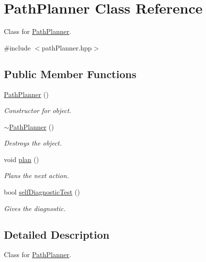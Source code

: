 \hypertarget{class_path_planner}{}\section{Path\+Planner Class Reference}
\label{class_path_planner}


Class for \hyperlink{class_path_planner}{Path\+Planner}.  




{\ttfamily \#include $<$path\+Planner.\+hpp$>$}

\subsection*{Public Member Functions}
\begin{DoxyCompactItemize}
\item 
\hyperlink{class_path_planner_a376f30d795cfe0a40f8923f49336f7da}{Path\+Planner} ()
\begin{DoxyCompactList}\small\item\em Constructor for object. \end{DoxyCompactList}\item 
\hyperlink{class_path_planner_a61bd61f848e519df56b75eddd3732ab8}{$\sim$\+Path\+Planner} ()\hypertarget{class_path_planner_a61bd61f848e519df56b75eddd3732ab8}{}\label{class_path_planner_a61bd61f848e519df56b75eddd3732ab8}

\begin{DoxyCompactList}\small\item\em Destroys the object. \end{DoxyCompactList}\item 
void \hyperlink{class_path_planner_a8049fa74ff66885faab080a07cdfc3dd}{plan} ()
\begin{DoxyCompactList}\small\item\em Plans the next action. \end{DoxyCompactList}\item 
bool \hyperlink{class_path_planner_a2c6f3668450f6a1c36a39f25a020c558}{self\+Diagnostic\+Test} ()
\begin{DoxyCompactList}\small\item\em Gives the diagnostic. \end{DoxyCompactList}\end{DoxyCompactItemize}


\subsection{Detailed Description}
Class for \hyperlink{class_path_planner}{Path\+Planner}. 

